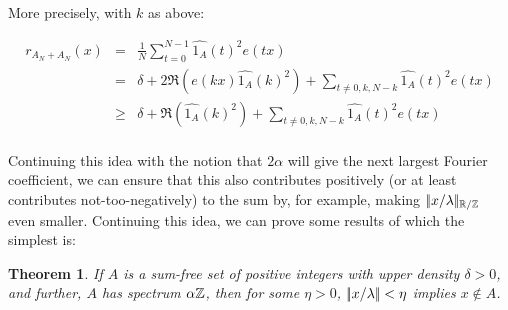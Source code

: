 \documentclass{article}
\newtheorem{theorem}{Theorem}[section]
\theoremstyle{definition}
\theoremstyle{remark}
\numberwithin{equation}{section}
\begin{document}
More precisely, with $k$ as above:

\begin{eqnarray*}
r_{A_N+A_N}(x) &=& \frac 1N \sum_{t=0}^{N-1} \widehat{1_A}(t)^2 e(tx)\\
 &=& \delta + 2\Re(e(kx)\widehat{1_A}(k)^2) + \sum_{t\neq 0,k,N-k}
 \widehat{1_A}(t)^2 e(tx)\\
 &\geq& \delta + \Re(\widehat{1_A}(k)^2) + \sum_{t\neq 0,k,N-k}
 \widehat{1_A}(t)^2 e(tx)\\
\end{eqnarray*}

Continuing this idea with the notion that $2\alpha$ will give the next
largest Fourier coefficient, we can ensure that this also contributes
positively (or at least contributes not-too-negatively) to the sum by,
for example, making $|\!|x/\lambda|\!|_{\mathbb{R}/\mathbb{Z}}$ even smaller.  Continuing
this idea, we can prove some results of which the simplest is: 

\begin{theorem}\label{thm:hole1}
  If $A$ is a sum-free set of positive integers with upper density
  $\delta > 0$, and further, $A$ has spectrum $\alpha\mathbb{Z}$, then for
  some $\eta > 0$, $|\!|x/\lambda|\!| < \eta$ implies $x \notin A$.
\end{theorem}
\end{document}
